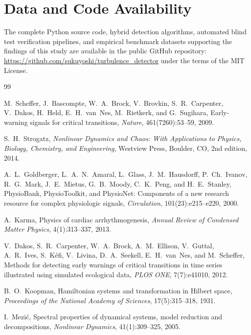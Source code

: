 \documentclass[11pt,a4paper]{article}
\begin{document}
\section*{Data and Code Availability}

The complete Python source code, hybrid detection algorithms, automated blind test verification pipelines, and empirical benchmark datasets supporting the findings of this study are available in the public GitHub repository: \url{https://github.com/sukuyoshi/turbulence_detector} under the terms of the MIT License.

\begin{thebibliography}{99}

M.~Scheffer, J.~Bascompte, W.~A.~Brock, V.~Brovkin, S.~R.~Carpenter, V.~Dakos, H.~Held, E.~H.~van~Nes, M.~Rietkerk, and G.~Sugihara,
\newblock Early-warning signals for critical transitions,
\newblock \emph{Nature}, 461(7260):53--59, 2009.

S.~H.~Strogatz,
\newblock \emph{Nonlinear Dynamics and Chaos: With Applications to Physics, Biology, Chemistry, and Engineering},
\newblock Westview Press, Boulder, CO, 2nd edition, 2014.

A.~L.~Goldberger, L.~A.~N.~Amaral, L.~Glass, J.~M.~Hausdorff, P.~Ch.~Ivanov, R.~G.~Mark, J.~E.~Mietus, G.~B.~Moody, C.~K.~Peng, and H.~E.~Stanley,
\newblock PhysioBank, PhysioToolkit, and PhysioNet: Components of a new research resource for complex physiologic signals,
\newblock \emph{Circulation}, 101(23):e215--e220, 2000.

A.~Karma,
\newblock Physics of cardiac arrhythmogenesis,
\newblock \emph{Annual Review of Condensed Matter Physics}, 4(1):313--337, 2013.

V.~Dakos, S.~R.~Carpenter, W.~A.~Brock, A.~M.~Ellison, V.~Guttal, A.~R.~Ives, S.~K{\'e}fi, V.~Livina, D.~A.~Seekell, E.~H.~van~Nes, and M.~Scheffer,
\newblock Methods for detecting early warnings of critical transitions in time series illustrated using simulated ecological data,
\newblock \emph{PLOS ONE}, 7(7):e41010, 2012.

B.~O.~Koopman,
\newblock Hamiltonian systems and transformation in Hilbert space,
\newblock \emph{Proceedings of the National Academy of Sciences}, 17(5):315--318, 1931.

I.~Mezi{\'c},
\newblock Spectral properties of dynamical systems, model reduction and decompositions,
\newblock \emph{Nonlinear Dynamics}, 41(1):309--325, 2005.


\end{thebibliography}
\end{document}
